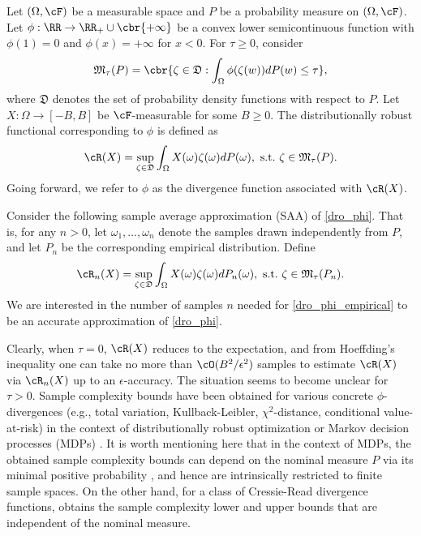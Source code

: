 \documentclass[9pt]{article} %
\numberwithin{equation}{section}
\begin{document}
Let $(\Omega, \cF)$ be a measurable space and $P$ be a probability measure on $(\Omega, \cF)$.
Let $\phi: \RR \to \RR_+ \cup \cbr{+\infty}$ be a convex lower semicontinuous function with $\phi(1)= 0$ and $\phi(x) = +\infty$ for $x < 0$.
For $\tau\geq 0$, consider  
\begin{align*}
    \mathfrak{M}_\tau(P) = \cbr{
    \zeta \in \mathfrak{D}: \int_{\Omega} \phi(\zeta(w)) d P(w) \leq \tau
    },
\end{align*}
where $\mathfrak{D}$ denotes the set of probability density functions with respect to $P$.
Let $X: \Omega \to [-B, B]$ be $\cF$-measurable for some $B \geq 0$.
The distributionally robust functional corresponding to $\phi$ is defined  as
\begin{align}\label{dro_phi}
    \cR(X) = \sup_{\zeta \in \mathfrak{D}} \int_{\Omega} X(\omega) \zeta(\omega) d P(\omega) , ~ \mathrm{s.t.}~ 
    \zeta \in \mathfrak{M}_\tau(P).
\end{align}
Going forward, we refer to $\phi$ as the divergence function associated with $\cR(X)$.

Consider the following sample average approximation (SAA) of \eqref{dro_phi}. 
That is, for any $n>0$, let $\omega_1, \ldots, \omega_n$ denote the samples drawn independently from $P$, and let $P_n$ be the corresponding empirical distribution. 
Define 
\begin{align}\label{dro_phi_empirical}
    \cR_n(X) = \sup_{\zeta \in \mathfrak{D}} \int_{\Omega} X(\omega) \zeta(\omega) d P_n(\omega) , ~ \mathrm{s.t.}~ 
    \zeta \in \mathfrak{M}_\tau(P_n).
\end{align}
We are interested in the number of samples $n$ needed for \eqref{dro_phi_empirical} to be an accurate approximation of \eqref{dro_phi}. 



Clearly, when $\tau = 0$, $\cR(X)$ reduces to the expectation, and from Hoeffding's inequality one can take no more than $\cO(B^2/\epsilon^2)$  samples to estimate $\cR(X)$ via $\cR_n(X)$ up to an $\epsilon$-accuracy.
The situation seems to become unclear for $\tau > 0$. 
Sample complexity bounds have been obtained for various concrete $\phi$-divergences (e.g., total variation, Kullback-Leibler, $\chi^2$-distance, conditional value-at-risk) in the context of distributionally robust optimization \cite{duchi2021learning,levy2020large} or Markov decision processes (MDPs) \cite{yang2022toward, xu2023improved, shi2024distributionally,wang2024sample,shi2023curious}.
It is worth mentioning here that in the context of MDPs,  the obtained sample complexity bounds can depend on the nominal measure $P$ via its minimal positive probability \cite{yang2022toward, xu2023improved,shi2024distributionally}, and hence are intrinsically restricted to finite sample spaces. 
On the other hand, for a class of  Cressie-Read divergence functions, \cite{duchi2021learning} obtains the sample complexity lower and upper bounds that are independent of the nominal measure.
\end{document}
